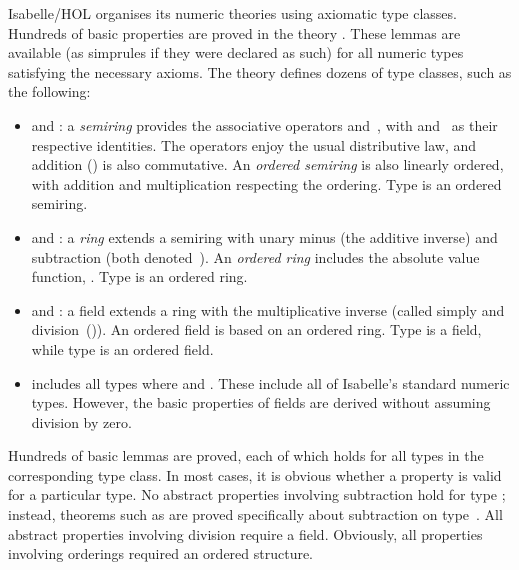 Isabelle/HOL organises its numeric theories using axiomatic type classes.
Hundreds of basic properties are proved in the theory .
These lemmas are available (as simprules if they were declared as such)
for all numeric types satisfying the necessary axioms. The theory defines
dozens of type classes, such as the following:
\begin{itemize}
\item
{} and : a \emph{semiring}
provides the associative operators \isa{+} and~\isa{*}, with  and~
as their respective identities. The operators enjoy the usual distributive law,
and addition (\isa{+}) is also commutative.
An \emph{ordered semiring} is also linearly
ordered, with addition and multiplication respecting the ordering. Type  is an ordered semiring.
\item
{} and : a \emph{ring} extends a semiring
with unary minus (the additive inverse) and subtraction (both
denoted~\isa{-}). An \emph{ordered ring} includes the absolute value
function, . Type  is an ordered ring.
\item
{} and : a field extends a ring with the
multiplicative inverse (called simply  and division~(\isa{/})).
An ordered field is based on an ordered ring. Type  is a field, while type  is an ordered field.
\item
{} includes all types where 
and . These include all of Isabelle's standard numeric types.
However, the basic properties of fields are derived without assuming
division by zero.
\end{itemize}

Hundreds of basic lemmas are proved, each of which
holds for all types in the corresponding type class. In most
cases, it is obvious whether a property is valid for a particular type. No
abstract properties involving subtraction hold for type ;
instead, theorems such as
 are proved specifically about subtraction on
type~. All abstract properties involving division require a field.
Obviously, all properties involving orderings required an ordered
structure.

